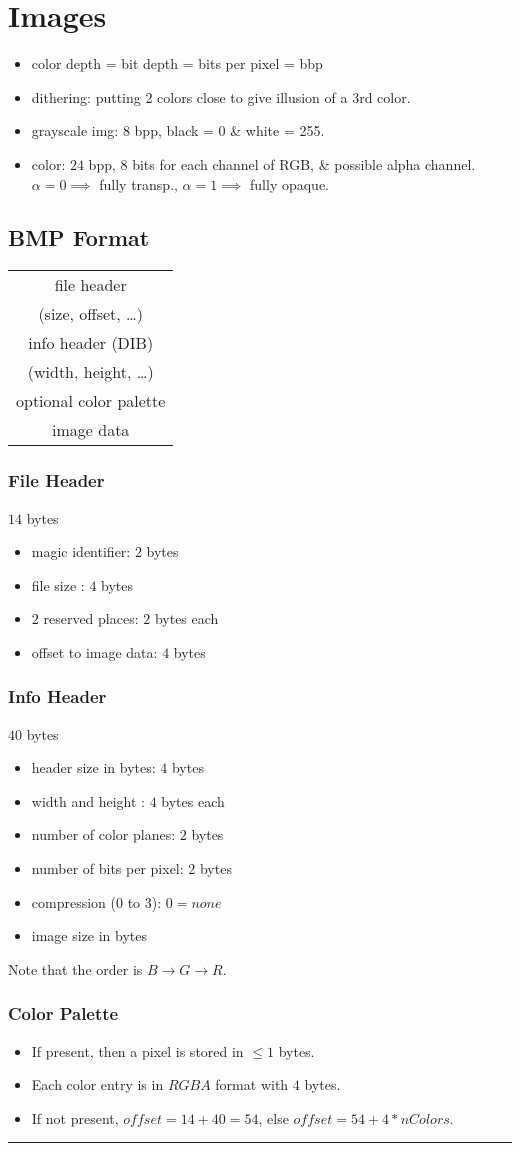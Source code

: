 \section{Images}
\begin{itemize}
  \item color depth = bit depth = bits per pixel = bbp
  \item dithering: putting 2 colors close to give illusion of a 3rd color.
  \item grayscale img: $8$ bpp, black = 0 \& white = 255.
  \item color: $24$ bpp, $8$ bits for each channel of RGB, \& possible alpha channel. $\alpha = 0 \implies$ fully transp., $\alpha = 1 \implies$ fully opaque.
\end{itemize}
\subsection{BMP Format}
\begin{tabular}{|c|}
  \hline
  file header\\
  (size, offset, \dots)\\
  \hline
  info header (DIB)\\
  (width, height, \dots)\\
  \hline
  optional color palette\\
  \hline
  image data\\
  \hline
\end{tabular}
\subsubsection{File Header}
$14$ bytes
\begin{itemize}
  \item magic identifier: $2$ bytes
  \item file size : $4$ bytes
  \item $2$ reserved places: $2$ bytes each
  \item offset to image data: $4$ bytes
\end{itemize}
\subsubsection{Info Header}
$40$ bytes
\begin{itemize}
  \item header size in bytes: $4$ bytes
  \item width and height : $4$ bytes each
  \item number of color planes: $2$ bytes
  \item number of bits per pixel: $2$ bytes
  \item compression (0 to 3): $0 = none$
  \item image size in bytes
\end{itemize}
{\color{red} Note that the order is $B \rightarrow G \rightarrow R$.}
\subsubsection{Color Palette}
\begin{itemize}
  \item If present, then a pixel is stored in $\leq 1$ bytes.
  \item Each color entry is in $RGBA$ format with $4$ bytes.
  \item If not present, $offset = 14+40 =54$, else $offset=54+4*nColors$.
\end{itemize}
\hrule
